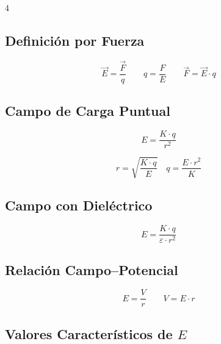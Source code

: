 \documentclass[9pt, landscape, letterpaper]{extarticle}
\begin{document}
\begin{multicols}{4}

  \subsection{Definición por Fuerza}

  \begin{formulabox}
    $$\vec{E} = \frac{\vec{F}}{q} \qquad q = \frac{F}{E} \qquad \vec{F} = \vec{E} \cdot q$$
  \end{formulabox}

  \subsection{Campo de Carga Puntual}

  \begin{formulabox}
    $$E = \frac{K \cdot q}{r^2}$$
  \end{formulabox}

  \begin{despejesbox}[Despejes]
    $$r = \sqrt{\frac{K \cdot q}{E}} \quad q = \frac{E \cdot r^2}{K}$$
  \end{despejesbox}

  \subsection{Campo con Dieléctrico}

  \begin{formulabox}
    $$E = \frac{K \cdot q}{\varepsilon \cdot r^2}$$
  \end{formulabox}

  \subsection{Relación Campo--Potencial}

  \begin{formulabox}
    $$E = \frac{V}{r} \qquad V = E \cdot r$$
  \end{formulabox}

  \subsection{Valores Característicos de $E$}


\end{multicols}
\end{document}
